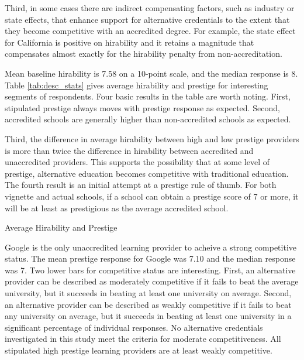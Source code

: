 \documentclass[review]{elsarticle}
\begin{document}
Third, in some cases there are indirect compensating factors, such as industry or state effects,
that enhance support for alternative credentials to the extent that they become competitive with an accredited degree.
For example, the state effect for California is positive on hirability
and it retains a magnitude that compensates almost exactly for the hirability penalty from non-accreditation.



Mean baseline hirability is 7.58 on a 10-point scale, and the median response is 8.
Table \ref{tab:desc_stats} gives average hirability and prestige for interesting segments of respondents.
Four basic results in the table are worth noting.
First, stipulated prestige always moves with prestige response as expected.
Second, accredited schools are generally higher than non-accredited schools as expected.

Third, the difference in average hirability between high and low prestige providers
is more than twice the difference in hirability between accredited and unaccredited providers.
This supports the possibility that at some level of prestige,
alternative education becomes competitive with traditional education.
The fourth result is an initial attempt at a prestige rule of thumb.
For both vignette and actual schools,
if a school can obtain a prestige score of 7 or more,
it will be at least as prestigious as the average accredited school.

\begin{table}
    \caption{Average Hirability and Prestige}
    \resizebox{\columnwidth}{!}{
        
    }
    \label{tab:desc_stats}
\end{table}

Google is the only unaccredited learning provider to acheive a strong competitive status.
The mean prestige response for Google was 7.10 and the median response was 7.
Two lower bars for competitive status are interesting.
First, an alternative provider can be described as moderately competitive if it fails to beat the average university,
but it succeeds in beating at least one university on average.
Second, an alternative provider can be described as weakly competitive if it fails to beat any university on average,
but it succeeds in beating at least one university in a significant percentage of individual responses.
No alternative credentials investigated in this study meet the criteria for moderate competitiveness.
All stipulated high prestige learning providers are at least weakly competitive.
\end{document}
